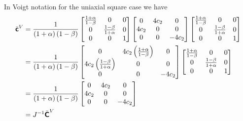 In Voigt notation for the uniaxial square case we have
\begin{equation}
  \begin{split}
    \bar{\boldsymbol{\mathsf{c}}}^{V}&=\dfrac{1}{\left( 1+\alpha \right)\left( 1-\beta \right)}\begin{bmatrix}
      \frac{1+\alpha}{1-\beta} & 0 & 0 \\
      0 & \frac{1-\beta}{1+\alpha} & 0 \\
      0 & 0 & 1
    \end{bmatrix}\begin{bmatrix}
      0 & 4c_{2} & 0 \\
      4c_{2} & 0 & 0 \\
      0 & 0 & -4c_{2}
    \end{bmatrix}\begin{bmatrix}
      \frac{1+\alpha}{1-\beta} & 0 & 0 \\
      0 & \frac{1-\beta}{1+\alpha} & 0 \\
      0 & 0 & 1
    \end{bmatrix}\\
    &=\dfrac{1}{\left( 1+\alpha \right)\left( 1-\beta \right)}\begin{bmatrix}
      0 & 4c_{2}\left( \frac{1+\alpha}{1-\beta} \right) & 0 \\
      4c_{2}\left( \frac{1-\beta}{1+\alpha} \right) & 0 & 0 \\
      0 & 0 & -4c_{2}
    \end{bmatrix}\begin{bmatrix}
      \frac{1+\alpha}{1-\beta} & 0 & 0 \\
      0 & \frac{1-\beta}{1+\alpha} & 0 \\
      0 & 0 & 1
    \end{bmatrix}\\
    &=\dfrac{1}{\left( 1+\alpha \right)\left( 1-\beta \right)}\begin{bmatrix}
      0 & 4c_{2} & 0 \\
      4c_{2} & 0 & 0 \\
      0 & 0 & -4c_{2}
    \end{bmatrix}\\
    &={J}^{-1}\bar{\boldsymbol{\mathsf{C}}}^{V}
  \end{split}
\end{equation}

